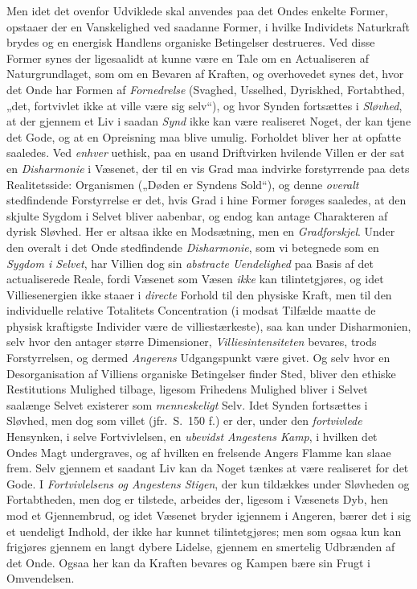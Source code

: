 Men idet det ovenfor Udviklede skal anvendes paa det Ondes enkelte Former,
opstaaer der en Vanskelighed ved saadanne Former, i hvilke Individets Naturkraft
brydes og en energisk Handlens organiske Betingelser destrueres. Ved disse Former
synes der ligesaalidt at kunne være en Tale om en Actualiseren af
Naturgrundlaget, som om en Bevaren af Kraften, og overhovedet synes det, hvor det
Onde har Formen af \emph{Fornedrelse} (Svaghed, Usselhed, Dyriskhed, Fortabthed,
„det, fortvivlet ikke at ville være sig selv“), og hvor Synden fortsættes i
\emph{Sløvhed}, at der gjennem et Liv i saadan \emph{Synd} ikke kan være
realiseret Noget, der kan tjene det Gode, og at en Opreisning maa blive umulig.
Forholdet bliver her at opfatte saaledes. Ved \emph{enhver} uethisk, paa en usand
Driftvirken hvilende Villen er der sat en \emph{Disharmonie} i Væsenet, der til
en vis Grad maa indvirke forstyrrende paa dets Realitetsside: Organismen
(„Døden er Syndens Sold“), og denne \emph{overalt} stedfindende Forstyrrelse er
det, hvis Grad i hine Former forøges saaledes, at den skjulte Sygdom i Selvet
bliver aabenbar, og endog kan antage Charakteren af dyrisk Sløvhed. Her er altsaa
ikke en Modsætning, men en \emph{Gradforskjel}. Under den overalt i det Onde
stedfindende \emph{Disharmonie}, som vi betegnede som en \emph{Sygdom i Selvet},
har Villien dog sin \emph{abstracte Uendelighed} paa Basis af det actualiserede
Reale, fordi Væsenet som Væsen \emph{ikke} kan tilintetgjøres, og idet
Villiesenergien ikke staaer i \emph{directe} Forhold til den
 physiske Kraft, men til den individuelle relative Totalitets Concentration (i
modsat Tilfælde maatte de physisk kraftigste Individer være de villiestærkeste),
saa kan under Disharmonien, selv hvor den antager større Dimensioner,
\emph{Villiesintensiteten} bevares, trods Forstyrrelsen, og dermed
\emph{Angerens} Udgangspunkt være givet. Og selv hvor en Desorganisation af
Villiens organiske Betingelser finder Sted, bliver den ethiske Restitutions
Mulighed tilbage, ligesom Frihedens Mulighed bliver i Selvet saalænge Selvet
existerer som \emph{menneskeligt} Selv. Idet Synden fortsættes i Sløvhed, men dog
som villet (jfr.\ S.\ 150 f.) er der, under den \emph{fortvivlede} Hensynken, i
selve Fortvivlelsen, en \emph{ubevidst Angestens Kamp}, i hvilken det Ondes Magt
undergraves, og af hvilken en frelsende Angers Flamme kan slaae frem. Selv
gjennem et saadant Liv kan da Noget tænkes at være realiseret for det Gode. I
\emph{Fortvivlelsens og Angestens Stigen}, der kun tildækkes under Sløvheden og
Fortabtheden, men dog er tilstede, arbeides der, ligesom i Væsenets Dyb, hen mod
et Gjennembrud, og idet Væsenet bryder igjennem i Angeren, bærer det i sig et
uendeligt Indhold, der ikke har kunnet tilintetgjøres; men som ogsaa kun kan
frigjøres gjennem en langt dybere Lidelse, gjennem en smertelig Udbrænden af det
Onde. Ogsaa her kan da Kraften bevares og Kampen bære sin Frugt i Omvendelsen.

